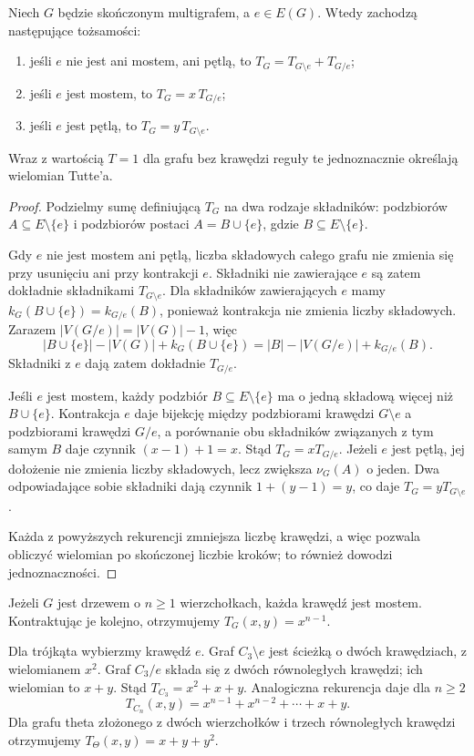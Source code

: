 \begin{twierdzenie}
\label{thm:tg-tutte-recursion}
Niech $G$ będzie skończonym multigrafem, a $e\in E(G)$.
Wtedy zachodzą następujące tożsamości:
\begin{enumerate}[label=(\roman*)]
\item jeśli $e$ nie jest ani mostem, ani pętlą, to
$T_G=T_{G\setminus e}+T_{G/e}$;
\item jeśli $e$ jest mostem, to $T_G=x\,T_{G/e}$;
\item jeśli $e$ jest pętlą, to $T_G=y\,T_{G\setminus e}$.
\end{enumerate}
Wraz z wartością $T=1$ dla grafu bez krawędzi reguły te
jednoznacznie określają wielomian Tutte'a.
\end{twierdzenie}

\begin{proof}
Podzielmy sumę definiującą $T_G$ na dwa rodzaje składników:
podzbiorów $A\subseteq E\setminus\{e\}$ i podzbiorów
postaci $A=B\cup\{e\}$, gdzie $B\subseteq E\setminus\{e\}$.

Gdy $e$ nie jest mostem ani pętlą, liczba składowych całego
grafu nie zmienia się przy usunięciu ani przy kontrakcji $e$.
Składniki nie zawierające $e$ są zatem dokładnie składnikami
$T_{G\setminus e}$. Dla składników zawierających $e$ mamy
$k_G(B\cup\{e\})=k_{G/e}(B)$, ponieważ kontrakcja
nie zmienia liczby składowych. Zarazem
$|V(G/e)|=|V(G)|-1$, więc
\[
|B\cup\{e\}|-|V(G)|+k_G(B\cup\{e\})
=|B|-|V(G/e)|+k_{G/e}(B).
\]
Składniki z $e$ dają zatem dokładnie $T_{G/e}$.

Jeśli $e$ jest mostem, każdy podzbiór $B\subseteq E\setminus\{e\}$
ma o jedną składową więcej niż $B\cup\{e\}$.
Kontrakcja $e$ daje bijekcję między podzbiorami krawędzi
$G\setminus e$ a podzbiorami krawędzi $G/e$, a porównanie
obu składników związanych z tym samym $B$ daje czynnik
$(x-1)+1=x$. Stąd $T_G=xT_{G/e}$.
Jeżeli $e$ jest pętlą, jej dołożenie nie zmienia liczby
składowych, lecz zwiększa $\nu_G(A)$ o jeden.
Dwa odpowiadające sobie składniki dają czynnik
$1+(y-1)=y$, co daje $T_G=yT_{G\setminus e}$.

Każda z powyższych rekurencji zmniejsza liczbę krawędzi,
a więc pozwala obliczyć wielomian po skończonej liczbie
kroków; to również dowodzi jednoznaczności.
\end{proof}

\begin{przyklad}
Jeżeli $G$ jest drzewem o $n\ge1$ wierzchołkach,
każda krawędź jest mostem. Kontraktując je kolejno,
otrzymujemy $T_G(x,y)=x^{n-1}$.

Dla trójkąta wybierzmy krawędź $e$.
Graf $C_3\setminus e$ jest ścieżką o dwóch krawędziach,
z wielomianem $x^2$. Graf $C_3/e$ składa się z dwóch
równoległych krawędzi; ich wielomian to $x+y$.
Stąd
$T_{C_3}=x^2+x+y$.
Analogiczna rekurencja daje dla $n\ge2$
\[
 T_{C_n}(x,y)=x^{n-1}+x^{n-2}+\cdots+x+y.
\]
Dla grafu theta złożonego z dwóch wierzchołków
i trzech równoległych krawędzi otrzymujemy
$T_{\Theta}(x,y)=x+y+y^2$.
\end{przyklad}

